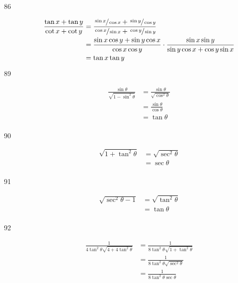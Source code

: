 \documentclass{exam}
\begin{document}
\begin{description}
      \item[86] 
        \begin{align*}
          \frac{\tan x + \tan y}{\cot x + \cot y} & = \frac{\sfrac{\sin x}{\cos x} + \sfrac{\sin y}{\cos y}}{\sfrac{\cos x}{\sin x} + \sfrac{\cos y}{\sin y}} \\
                                                  & = \frac{\sin x \cos y + \sin y \cos x}{\cos x \cos y} \cdot \frac{\sin x \sin y}{\sin y \cos x + \cos y \sin x} \\
                                                  & = \tan x \tan y \\
        \end{align*}

      \item[89] 
        \begin{align*}
          \frac{\sin \theta}{\sqrt{1 - \sin^2 \theta}} & = \frac{\sin \theta}{\sqrt{\cos^2 \theta}} \\
                                                       & = \frac{\sin \theta}{\cos \theta} \\
                                                       & = \tan \theta \\
        \end{align*}

      \item[90] 
        \begin{align*}
          \sqrt{1 + \tan^2 \theta} & = \sqrt{\sec^2 \theta} \\
                                   & = \sec \theta \\
        \end{align*}

      \item[91] 
        \begin{align*}
          \sqrt{\sec^2 \theta - 1} & = \sqrt{\tan^2 \theta} \\
                                   & = \tan \theta \\
        \end{align*}

      \item[92] 
        \begin{align*}
          \frac{1}{4 \tan^2 \theta \sqrt{4 + 4 \tan^2 \theta}} & = \frac{1}{8 \tan^2 \theta \sqrt{1 + \tan^2 \theta}} \\
                                                               & = \frac{1}{8 \tan^2 \theta \sqrt{\sec^2 \theta}} \\
                                                               & = \frac{1}{8 \tan^2 \theta \sec \theta} \\
        \end{align*}

    \end{description}
\end{document}
